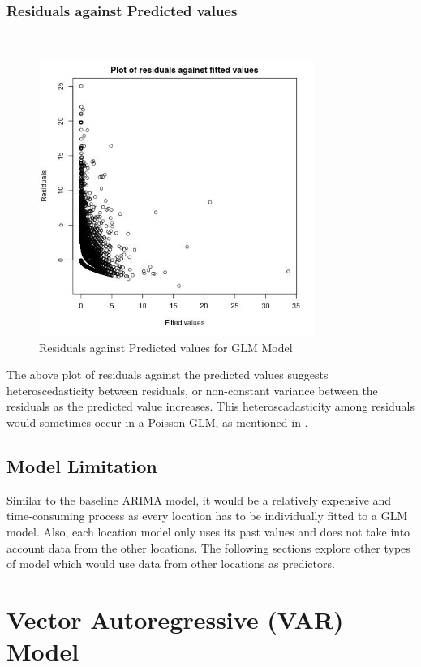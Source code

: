 \documentclass[nonblindrev,msom]{informs3} %
\begin{document}
\subsubsection{Residuals against Predicted values}
\hfill\\
\begin{figure}[H]
    \centering
    \includegraphics[width=0.8\textwidth, height=0.5\textheight]{Images/Full_GLM_resids_vs_fitted.jpg}
    \caption{Residuals against Predicted values for GLM Model}
    \label{fig:Residuals against Predicted values for GLM Model}
\end{figure}
The above plot of residuals against the predicted values suggests heteroscedasticity between residuals, or non-constant variance between the residuals as the predicted value increases. This heteroscadasticity among residuals would sometimes occur in a Poisson GLM, as mentioned in \cite{Dylan2017}. 

\subsection{Model Limitation}
Similar to the baseline ARIMA model, it would be a relatively expensive and time-consuming process as every location has to be individually fitted to a GLM model. Also, each location model only uses its past values and does not take into account data from the other locations. The following sections explore other types of model which would use data from other locations as predictors. 

\section{Vector Autoregressive (VAR) Model}
\end{document}
